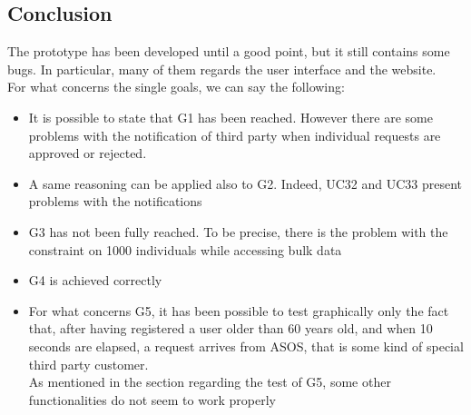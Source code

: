 \subsection{Conclusion}
The prototype has been developed until a good point, but it still contains some bugs. In particular, many of them regards the user interface
and the website. \\
For what concerns the single goals, we can say the following:

\begin{itemize}
\item
It is possible to state that G1 has been reached. However there are some problems with the notification of third party when individual
requests are approved or rejected.

\item
A same reasoning can be applied also to G2. Indeed, UC32 and UC33 present problems with the notifications

\item
G3 has not been fully reached. To be precise, there is the problem with the constraint on 1000 individuals while accessing bulk data

\item 
G4 is achieved correctly

\item 
For what concerns G5, it has been possible to test graphically only the fact that, after having registered a user older than 60 years old, 
and when 10 seconds are elapsed, a request arrives from ASOS, that is some kind of special third party customer. \\
As mentioned in the section regarding the test of G5, some other functionalities do not seem to work properly

\end{itemize}

